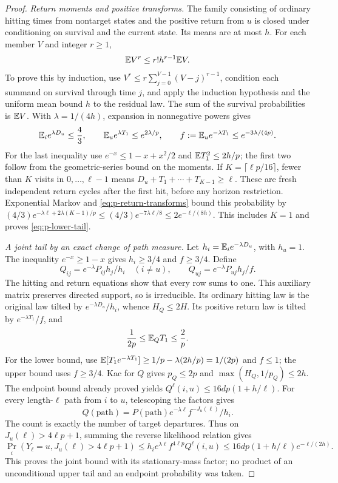 \begin{proof}
\emph{Return moments and positive transforms.}
The family consisting of ordinary hitting times from nontarget states and
the positive return from $u$ is closed under conditioning on survival and
the current state.  Its means are at most $h$.  For each member $V$ and
integer $r\ge1$,
\begin{equation}\label{eq:p-return-moment}
 \mathbb E V^r\le r!h^{r-1}\mathbb E V.
\end{equation}
To prove this by induction, use
$V^r\le r\sum_{j=0}^{V-1}(V-j)^{r-1}$, condition each summand on
survival through time $j$, and apply the induction hypothesis and the
uniform mean bound $h$ to the residual law.  The sum of the survival
probabilities is $\mathbb E V$.
With $\lambda=1/(4h)$, expansion in nonnegative powers gives
\begin{equation}\label{eq:p-return-transforms}
 \mathbb E_i e^{\lambda D_u}\le\frac43,\qquad
 \mathbb E_u e^{\lambda T_1}\le e^{2\lambda/p},\qquad
 f:=\mathbb E_u e^{-\lambda T_1}\le e^{-3\lambda/(4p)}.
\end{equation}
For the last inequality use $e^{-x}\le1-x+x^2/2$ and
$\mathbb E T_1^2\le2h/p$; the first two follow from the geometric-series
bound on the moments.  If $K=\lceil\ell p/16\rceil$, fewer than $K$
visits in $0,\ldots,\ell-1$ means
$D_u+T_1+\cdots+T_{K-1}\ge\ell$.
These are fresh independent return cycles after the first hit, before any
horizon restriction.  Exponential Markov and \eqref{eq:p-return-transforms}
bound this probability by
$(4/3)e^{-\lambda\ell+2\lambda(K-1)/p}
\le(4/3)e^{-7\lambda\ell/8}\le2e^{-\ell/(8h)}$.
This includes $K=1$ and proves \eqref{eq:p-lower-tail}.

\emph{A joint tail by an exact change of path measure.}
Let $h_i=\mathbb E_i e^{-\lambda D_u}$, with $h_u=1$.
The inequality $e^{-x}\ge1-x$ gives $h_i\ge3/4$ and $f\ge3/4$.
Define
\[
 Q_{ij}=e^{-\lambda}P_{ij}h_j/h_i\quad(i\ne u),
 \qquad Q_{uj}=e^{-\lambda}P_{uj}h_j/f.
\]
The hitting and return equations show that every row sums to one.
This auxiliary matrix preserves directed support, so is irreducible.
Its ordinary hitting law is the original law tilted by
$e^{-\lambda D_u}/h_i$, whence $H_Q\le2H$.
Its positive return law is tilted by $e^{-\lambda T_1}/f$, and
\[
 \frac1{2p}\le\mathbb E_QT_1\le\frac2p.
\]
For the lower bound, use
$\mathbb E[T_1e^{-\lambda T_1}]\ge1/p-\lambda(2h/p)=1/(2p)$
and $f\le1$; the upper bound uses $f\ge3/4$.
Kac for $Q$ gives $p_Q\le2p$ and
$\max(H_Q,1/p_Q)\le2h$.  The endpoint bound already proved yields
$Q^\ell(i,u)\le16dp(1+h/\ell)$.
For every length-$\ell$ path from $i$ to $u$, telescoping the factors gives
\[
 Q(\text{path})=P(\text{path})e^{-\lambda\ell}
                  f^{-J_u(\ell)}/h_i.
\]
The count is exactly the number of target departures.  Thus on
$J_u(\ell)>4\ell p+1$, summing the reverse likelihood relation gives
\[
 \Pr_i(Y_\ell=u,J_u(\ell)>4\ell p+1)
 \le h_ie^{\lambda\ell}f^{4\ell p}Q^\ell(i,u)
 \le16dp(1+h/\ell)e^{-\ell/(2h)}.
\]
This proves the joint bound with its stationary-mass factor; no product
of an unconditional upper tail and an endpoint probability was taken.
\end{proof}

